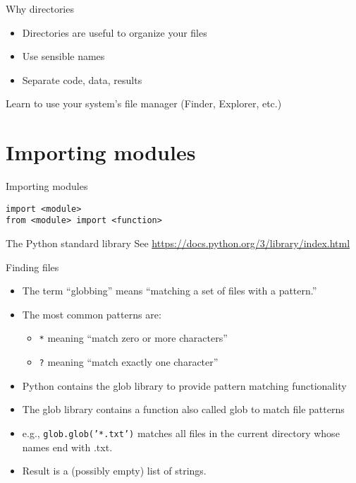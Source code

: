 \documentclass[aspectratio=169,usenames,dvipsnames]{beamer}
\begin{document}
\begin{frame}{Why directories}
    \begin{itemize}
        \item Directories are useful to organize your files
        \item Use sensible names
        \item Separate code, data, results
    \end{itemize}

    Learn to use your system's file manager (Finder, Explorer, etc.)
\end{frame}



\section{Importing modules}
\frame{\tableofcontents[currentsection]}

\begin{frame}[fragile]{Importing modules}
\begin{lstlisting}
import <module>
from <module> import <function>
\end{lstlisting}
\end{frame}

\begin{frame}[fragile]{The Python standard library}
    See \url{https://docs.python.org/3/library/index.html}
\end{frame}

\begin{frame}[fragile]{Finding files}
    \begin{itemize}
        \item The term ``globbing'' means ``matching a set of files with a pattern.''
        \item The most common patterns are:
            \begin{itemize}
                \item \texttt{*} meaning ``match zero or more characters''
                \item \texttt{?} meaning ``match exactly one character''
            \end{itemize}
        \item Python contains the glob library to provide pattern matching functionality
        \item The glob library contains a function also called glob to match
            file patterns
        \item e.g., \texttt{glob.glob('*.txt')} matches all files in the
            current directory whose names end with .txt.
        \item Result is a (possibly empty) list of strings.
    \end{itemize}
\end{frame}
\end{document}
